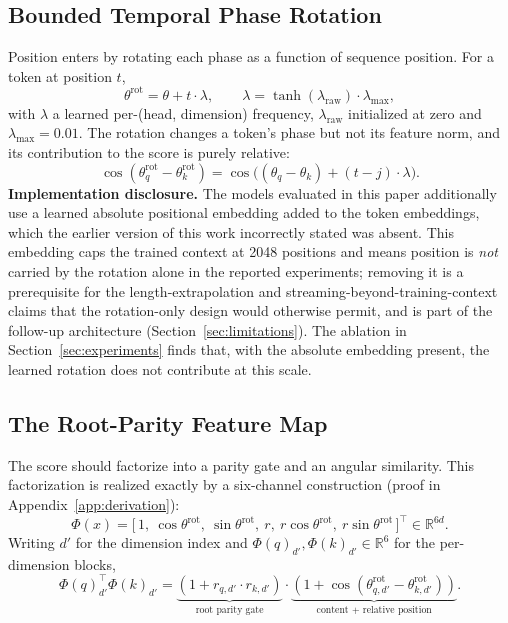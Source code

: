 \documentclass{article}
\newcommand{\R}{\mathbb{R}}
\begin{document}
\subsection{Bounded Temporal Phase Rotation}
\label{sec:rotation}

Position enters by rotating each phase as a function of sequence position. For a token at position $t$,
\begin{equation}
\theta^{\text{rot}} = \theta + t \cdot \lambda, \qquad \lambda = \tanh(\lambda_{\text{raw}}) \cdot \lambda_{\max},
\end{equation}
with $\lambda$ a learned per-(head, dimension) frequency, $\lambda_{\text{raw}}$ initialized at zero and $\lambda_{\max} = 0.01$. The rotation changes a token's phase but not its feature norm, and its contribution to the score is purely relative:
\begin{equation}
\cos(\theta^{\text{rot}}_q - \theta^{\text{rot}}_k) = \cos\big((\theta_q - \theta_k) + (t - j) \cdot \lambda\big).
\end{equation}
\textbf{Implementation disclosure.} The models evaluated in this paper additionally use a learned absolute positional embedding added to the token embeddings, which the earlier version of this work incorrectly stated was absent. This embedding caps the trained context at 2048 positions and means position is \emph{not} carried by the rotation alone in the reported experiments; removing it is a prerequisite for the length-extrapolation and streaming-beyond-training-context claims that the rotation-only design would otherwise permit, and is part of the follow-up architecture (Section~\ref{sec:limitations}). The ablation in Section~\ref{sec:experiments} finds that, with the absolute embedding present, the learned rotation does not contribute at this scale.

\subsection{The Root-Parity Feature Map}
\label{sec:sixpath}

The score should factorize into a parity gate and an angular similarity. This factorization is realized exactly by a six-channel construction (proof in Appendix~\ref{app:derivation}):
\begin{equation}
\boxed{\Phi(x) = \big[\, 1,\ \cos\theta^{\text{rot}},\ \sin\theta^{\text{rot}},\ r,\ r\cos\theta^{\text{rot}},\ r\sin\theta^{\text{rot}} \,\big]^\top \in \R^{6d}.}
\end{equation}
Writing $d'$ for the dimension index and $\Phi(q)_{d'}, \Phi(k)_{d'} \in \R^6$ for the per-dimension blocks,
\begin{equation}
\Phi(q)_{d'}^\top \Phi(k)_{d'} = \underbrace{(1 + r_{q,d'} \cdot r_{k,d'})}_{\text{root parity gate}} \cdot \underbrace{(1 + \cos(\theta^{\text{rot}}_{q,d'} - \theta^{\text{rot}}_{k,d'}))}_{\text{content + relative position}}.
\label{eq:parity}
\end{equation}
\end{document}
